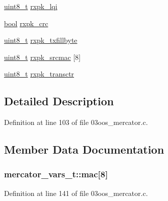 \begin{DoxyCompactItemize}
\hyperlink{_p_e___types_8h_aba7bc1797add20fe3efdf37ced1182c5}{uint8\+\_\+t} \hyperlink{structmercator__vars__t_aabe11892a27173caac0f0f211b3ddaa8}{rxpk\+\_\+lqi}
\item 
\hyperlink{_p_e___types_8h_a97a80ca1602ebf2303258971a2c938e2}{bool} \hyperlink{structmercator__vars__t_aa0fca655c9b4f901d99f65da52aaa153}{rxpk\+\_\+crc}
\item 
\hyperlink{_p_e___types_8h_aba7bc1797add20fe3efdf37ced1182c5}{uint8\+\_\+t} \hyperlink{structmercator__vars__t_af651882ee6b15f9da0c5e0691d77537d}{rxpk\+\_\+txfillbyte}
\item 
\hyperlink{_p_e___types_8h_aba7bc1797add20fe3efdf37ced1182c5}{uint8\+\_\+t} \hyperlink{structmercator__vars__t_a43aea269e06a3ef44bb9be3c9d59cdc9}{rxpk\+\_\+srcmac} \mbox{[}8\mbox{]}
\item 
\hyperlink{_p_e___types_8h_aba7bc1797add20fe3efdf37ced1182c5}{uint8\+\_\+t} \hyperlink{structmercator__vars__t_ac09acc68c7386e665841b6d5a3c99efe}{rxpk\+\_\+transctr}
\end{DoxyCompactItemize}


\subsection{Detailed Description}


Definition at line 103 of file 03oos\+\_\+mercator.\+c.



\subsection{Member Data Documentation}
\subsubsection[{\texorpdfstring{mac}{mac}}]{ mercator\+\_\+vars\+\_\+t\+::mac\mbox{[}8\mbox{]}}\hypertarget{structmercator__vars__t_abe709c2346357e15d64f73984b3872a5}{}\label{structmercator__vars__t_abe709c2346357e15d64f73984b3872a5}


Definition at line 141 of file 03oos\+\_\+mercator.\+c.

